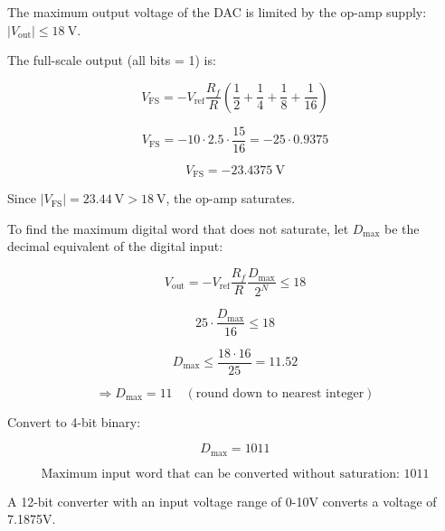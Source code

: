 \begin{solutionblock}

The maximum output voltage of the DAC is limited by the op-amp supply: $|V_{\text{out}}| \le 18 \ \text{V}$.

The full-scale output (all bits = 1) is:

\[
V_{\text{FS}} = - V_{\text{ref}} \frac{R_f}{R} \left( \frac{1}{2} + \frac{1}{4} + \frac{1}{8} + \frac{1}{16} \right)
\]

\[
V_{\text{FS}} = -10 \cdot 2.5 \cdot \frac{15}{16} = -25 \cdot 0.9375
\]

\[
V_{\text{FS}} = -23.4375 \ \text{V}
\]

Since $|V_{\text{FS}}| = 23.44 \ \text{V} > 18 \ \text{V}$, the op-amp saturates.  

To find the maximum digital word that does not saturate, let $D_{\text{max}}$ be the decimal equivalent of the digital input:

\[
V_{\text{out}} = - V_{\text{ref}} \frac{R_f}{R} \frac{D_{\text{max}}}{2^N} \le 18
\]

\[
25 \cdot \frac{D_{\text{max}}}{16} \le 18
\]

\[
D_{\text{max}} \le \frac{18 \cdot 16}{25} = 11.52
\]

\[
\Rightarrow D_{\text{max}} = 11 \quad (\text{round down to nearest integer})
\]

Convert to 4-bit binary:

\[
D_{\text{max}} = 1011
\]

\[
\boxed{\text{Maximum input word that can be converted without saturation: } 1011}
\]

\end{solutionblock}




A 12-bit converter with an input voltage range of 0-10V converts
a voltage of 7.1875V.


